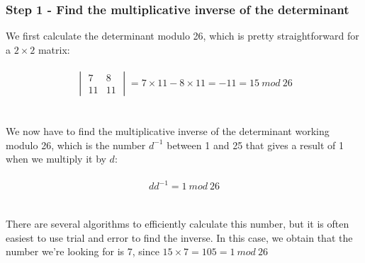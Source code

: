 \documentclass[Lau,binding=0.6cm,oneside]{sapthesis}
\begin{document}
\subsubsection{Step 1 - Find the multiplicative inverse of the determinant}
We first calculate the determinant modulo 26, which is pretty straightforward for a $2 \times 2$ matrix:\\\\
\begin{equation}
\begin{vmatrix}7&8\\11&11\end{vmatrix} = 7 \times 11 - 8 \times 11 = -11 = 15 \ mod \ 26
\end{equation}
\ \\\\
We now have to find the multiplicative inverse of the determinant working modulo 26, which is the number $d^{-1}$ between 1 and 25 that gives a result of 1 when we multiply it by $d$:\\\\
\begin{equation}
d d^{-1} = 1 \ mod \ 26
\end{equation}
\ \\\\
There are several algorithms to efficiently calculate this number, but it is often easiest to use trial and error to find the inverse. In this case, we obtain that the number we're looking for is 7, since $15 \times 7 = 105 = 1 \ mod \ 26$
\end{document}
